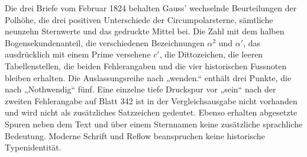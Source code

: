 Die drei Briefe vom Februar 1824 behalten Gauss’ wechselnde Beurteilungen der Polhöhe, die drei positiven Unterschiede der Circumpolarsterne, sämtliche neunzehn Sternwerte und das gedruckte Mittel bei. Die Zahl mit dem halben Bogensekundenanteil, die verschiedenen Bezeichnungen $\alpha^2$ und $\alpha'$, das ausdrücklich mit einem Prime versehene $c'$, die Dittozeichen, die leeren Tabellenstellen, die beiden Fehlerangaben und die vier historischen Fussnoten bleiben erhalten. Die Auslassungsreihe nach „wenden.“ enthält drei Punkte, die nach „Nothwendig“ fünf. Eine einzelne tiefe Druckspur vor „sein“ nach der zweiten Fehlerangabe auf Blatt 342 ist in der Vergleichsausgabe nicht vorhanden und wird nicht als zusätzliches Satzzeichen gedeutet. Ebenso erhalten abgesetzte Spuren neben dem Text und über einem Sternnamen keine zusätzliche sprachliche Bedeutung. Moderne Schrift und Reflow beanspruchen keine historische Typenidentität.
